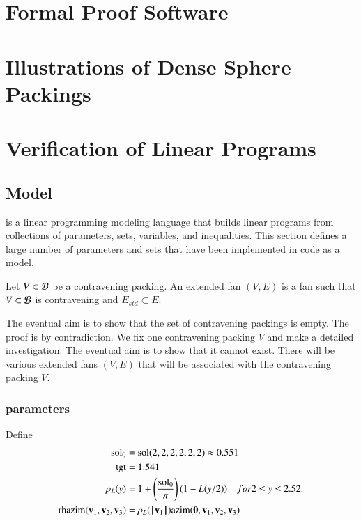 \chapter{Formal Proof Software}

\chapter{Illustrations of Dense Sphere Packings}


\chapter{Verification of Linear Programs}

\section{Model}

 is a linear programming modeling language that builds linear
programs from collections of parameters, sets, variables, and inequalities.
This section defines a large number of parameters and sets that have been
implemented in code as a  model.


\begin{definition}[extended]
Let $V\subset{\mathcal B}$ be a contravening packing.
An extended fan $(V,E)$ is a fan such that 
$V\subset{\mathcal B}$ is contravening 
and $E_{std}\subset E$.  
\end{definition}

The eventual aim is to show that the set of contravening packings is empty.  The proof
is by contradiction.
We fix one contravening packing $V$ and make a detailed investigation.  
The eventual aim is to show that it cannot exist.
There will be various extended fans $(V,E)$ that will be associated with
the contravening packing $V$.  




\subsection{parameters}








\begin{definition}
Define
\begin{align*}
\operatorname{sol}_0 &= \operatorname{sol}(2,2,2,2,2,2) \approx 0.551\\
{\operatorname{tgt}} &= 1.541\\
\rho_L(y) &= 1 + \left(\frac{\operatorname{sol}_0}{\pi}\right) (1-L(y/2))\quad for 2\le y\le 2.52.\\
{\operatorname{rhazim}}({\mathbf v}_1,{\mathbf v}_2,{\mathbf v}_3) &= \rho_L({{\hskip0.1em|\hskip-0.15em|\hskip0.1em}{\mathbf v}_1{\hskip0.1em|\hskip-0.15em|\hskip0.1em}}){\operatorname{azim}}({\mathbf 0},{\mathbf v}_1,{\mathbf v}_2,{\mathbf v}_3)\\
\end{align*}
\end{definition}






